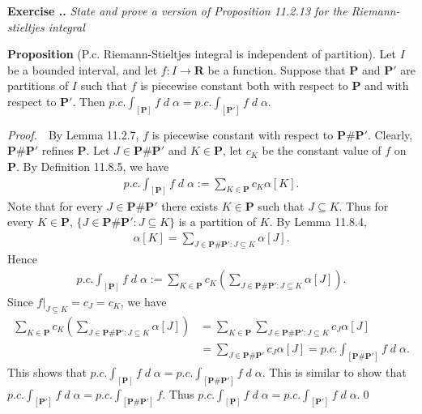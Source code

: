 \documentclass{book}
\DeclareMathOperator{\dd}{\mathit{d}}
\newcommand{\pff}{\vspace{.25em}\noindent\emph{Proof.}~~}
\newcommand{\titl}[1]{\noindent\textbf{#1}}
\newcounter{Exercise}[section]
\renewcommand{\theExercise}{\thesection.\arabic{Exercise}.}
\newcommand{\new}{\vspace{1.5em}\noindent\textbf{{Exercise \stepcounter{Exercise}\textbf{\theExercise}}} }
\begin{document}
\new\emph{State and prove a version of Proposition 11.2.13 for the Riemann-stieltjes integral}

\begin{framed}
\titl{Proposition} (P.c. Riemann-Stieltjes integral is independent of partition). Let $I$ be a bounded interval, and let $f : I \to \mathbf{R}$ be a function. Suppose that $\mathbf{P}$ and $\mathbf{P}'$ are partitions of $I$ such that $f$ is piecewise constant both with respect to $\mathbf{P}$ and with respect to $\mathbf{P}'$. Then $p.c. \int_{[\mathbf{P}]} f \dd\alpha = p.c. \int_{[\mathbf{P}']} f \dd\alpha$.
\end{framed}

\pff By Lemma 11.2.7, $f$ is piecewise constant with respect to $\mathbf{P}\#\mathbf{P'}$. Clearly, $\mathbf{P}\#\mathbf{P'}$ refines $\mathbf{P}$. Let $J\in\mathbf{P}\#\mathbf{P'}$ and $K\in\mathbf{P}$, let $c_K$ be the constant value of $f$ on $\mathbf{P}$. By Definition 11.8.5, we have
    \begin{align*}
        p.c.\int_{[\mathbf{P}]}f \dd\alpha := \sum_{K\in\mathbf{P}} c_{K} \alpha[K].
    \end{align*}
Note that for every $J\in\mathbf{P}\#\mathbf{P'}$ there exists $K\in\mathbf{P}$ such that $J\subseteq K$. Thus for every $K\in\mathbf{P}$, $\{J\in\mathbf{P}\#\mathbf{P'}:J\subseteq K\}$ is a partition of $K$. By Lemma 11.8.4,
    \begin{align*}
        \alpha[K] = \sum_{J\in\mathbf{P}\#\mathbf{P'}:J\subseteq K} \alpha[J].
    \end{align*}
Hence
    \begin{align*}
        p.c.\int_{[\mathbf{P}]} f \dd\alpha := \sum_{K\in\mathbf{P}} c_{K} \left(\sum_{J \in \mathbf{P} \# \mathbf{P'} : J \subseteq K} \alpha[J]\right).
    \end{align*}
Since $f|_{J\subseteq K} = c_J = c_K$, we have
    \begin{align*}
        \sum_{K\in\mathbf{P}}c_{K}\left(\sum_{J \in \mathbf{P} \# \mathbf{P'} : J \subseteq K} \alpha[J]\right)
        &=\sum_{K \in \mathbf{P}} \sum_{J\in\mathbf{P}\#\mathbf{P'} : J \subseteq K} c_{J} \alpha[J]\\
        &=\sum_{J\in\mathbf{P}\#\mathbf{P'}} c_{J} \alpha[J]
        =p.c.\int_{[\mathbf{P}\#\mathbf{P'}]} f \dd\alpha.
    \end{align*}
This shows that $p.c.\int_{[\mathbf{P}]} f \dd\alpha = p.c.\int_{[\mathbf{P}\#\mathbf{P'}]} f \dd\alpha$. This is similar to show that $p.c.\int_{[\mathbf{P'}]} f \dd\alpha = p.c.\int_{[\mathbf{P} \# \mathbf{P'}]} f$. Thus $p.c.\int_{[\mathbf{P}]} f \dd\alpha = p.c.\int_{[\mathbf{P'}]} f \dd\alpha$.\qed
\end{document}
